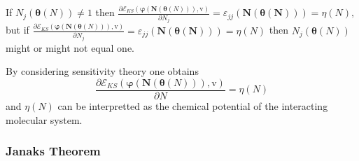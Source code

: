 \documentclass[aps,preprint]{revtex4}%
\begin{document}
If $N_{j}\left(  \mathbf{\theta}\left(  N\right)  \right)  \neq1$ then
$\frac{\partial\mathcal{E}_{KS}\left(  \mathbf{\varphi}\left(  \mathbf{N}%
\left(  \mathbf{\theta}\left(  N\right)  \right)  \right)  \mathbf{,}%
\mathrm{v}\right)  }{\partial N_{j}}=\varepsilon_{jj}\mathbf{\left(
\mathbf{N}\left(  \mathbf{\theta}\left(  N\right)  \right)  \right)  }%
=\eta\left(  N\right)  ,$ but if $\frac{\partial\mathcal{E}_{KS}\left(
\mathbf{\varphi}\left(  \mathbf{N}\left(  \mathbf{\theta}\left(  N\right)
\right)  \right)  \mathbf{,}\mathrm{v}\right)  }{\partial N_{j}}%
=\varepsilon_{jj}\mathbf{\left(  \mathbf{N}\left(  \mathbf{\theta}\left(
N\right)  \right)  \right)  }=\eta\left(  N\right)  $ then $N_{j}\left(
\mathbf{\theta}\left(  N\right)  \right)  $ might or might not equal one.

By considering sensitivity theory one obtains
\begin{equation}
\frac{\partial\mathcal{E}_{KS}\left(  \mathbf{\varphi}\left(  \mathbf{N}%
\left(  \mathbf{\theta}\left(  N\right)  \right)  \right)  \mathbf{,}%
\mathrm{v}\right)  }{\partial N}=\eta\left(  N\right)
\end{equation}
and $\eta\left(  N\right)  $ can be interpretted as the chemical potential of
the interacting molecular system.

\subsubsection{Janaks Theorem}
\end{document}
